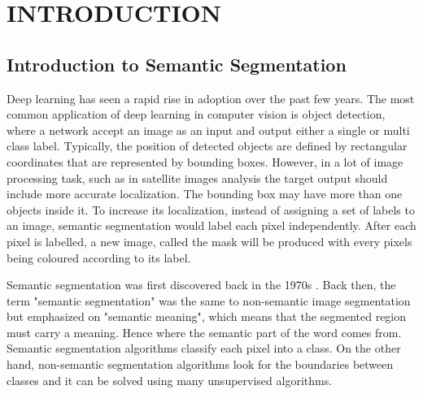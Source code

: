 \chapter{INTRODUCTION}
\section{Introduction to Semantic Segmentation}

Deep learning has seen a rapid rise in adoption over the past few years. The most common application of deep learning in computer vision is object detection, where a network accept an image as an input and output either a single or multi class label. Typically, the position of detected objects are defined by rectangular coordinates that are represented by bounding boxes. However, in a lot of image processing task, such as in satellite images analysis the target output should include more accurate localization. The bounding box may have more than one objects inside it. To increase its localization, instead of assigning a set of labels to an image, semantic segmentation would label each pixel independently. After each pixel is labelled, a new image, called the mask  will be produced with every pixels being coloured according to its label.

Semantic segmentation was first discovered back in the 1970s \cite{YU201882}. Back then, the term "semantic segmentation" was the same to non-semantic image segmentation but emphasized on "semantic meaning", which means that the segmented region must carry a meaning. Hence where the semantic part of the word comes from. Semantic segmentation algorithms classify each pixel into a class. On the other hand, non-semantic segmentation algorithms look for the boundaries between classes and it can be solved using many unsupervised algorithms. 

